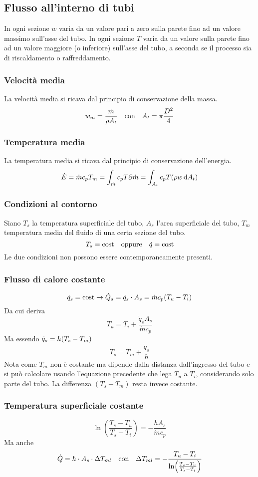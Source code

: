 \subsection{Flusso all'interno di tubi}
In ogni sezione $w$ varia da un valore pari a zero sulla parete fino ad un valore massimo sull'asse del tubo.
In ogni sezione $T$ varia da un valore sulla parete fino ad un valore maggiore (o inferiore) sull'asse del tubo, a seconda se il processo sia di riscaldamento o raffreddamento.

\subsubsection{Velocità media}
La velocità media si ricava dal principio di conservazione della massa.
\[ w_m = \frac{\dot{m}}{\rho A_t} \qq{con} A_t = \pi \frac{D^2}{4} \]

\subsubsection{Temperatura media}
La temperatura media si ricava dal principio di conservazione dell'energia.
\[ \dot{E} = \dot{m} c_p T_m = \int_{\dot{m}} c_p T \partial \dot{m} = \int_{A_t} c_p T \qty(\rho w \dd{A_t}) \]

\subsubsection{Condizioni al contorno}
Siano $T_s$ la temperatura superficiale del tubo, $A_s$ l'area superficiale del tubo, $T_m$ temperatura media del fluido di una certa sezione del tubo.
\[ T_s = \text{cost} \qq{oppure} \dot{q} = \text{cost} \]
Le due condizioni non possono essere contemporaneamente presenti.

\subsubsection{Flusso di calore costante}
\[ \dot{q}_s = \text{cost} \rightarrow \dot{Q}_s = \dot{q}_s \cdot A_s = \dot{m} c_p \qty(T_u - T_i) \]
Da cui deriva 
\[ T_u = T_i + \frac{\dot{q}_s A_s}{\dot{m} c_p} \]
Ma essendo $\dot{q}_s = h \qty(T_s - T_m)$
\[ T_s = T_m + \frac{\dot{q}_s}{h} \]
Nota come $T_m$ non è costante ma dipende dalla distanza dall'ingresso del tubo e si può calcolare usando l'equazione precedente che lega $T_u$ a $T_i$, considerando solo parte del tubo.
La differenza $(T_s - T_m)$ resta invece costante.

\subsubsection{Temperatura superficiale costante}
\[ \ln(\frac{T_s - T_u}{T_s - T_i}) = - \frac{h A_s}{\dot{m} c_p} \]
Ma anche
\[ \dot{Q} = h \cdot A_s \cdot \Delta T_{ml} \qq{con} \Delta T_{ml} = - \frac{T_u - T_i}{\ln(\frac{T_s - T_u}{T_s - T_i})} \]


